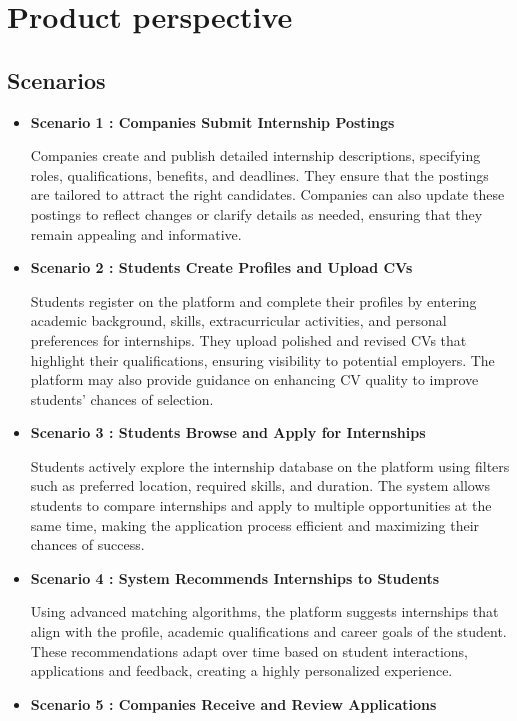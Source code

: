 \section{Product perspective}
\label{sec:product_perspective}%



\subsection{Scenarios}
\label{subsec:scenarios}%
\begin{itemize}
    \item \textbf{Scenario 1 : Companies Submit Internship Postings}

Companies create and publish detailed internship descriptions, specifying roles, qualifications, benefits, and deadlines. They ensure that the postings are tailored to attract the right candidates. Companies can also update these postings to reflect changes or clarify details as needed, ensuring that they remain appealing and informative.
    \item \textbf{Scenario 2 : Students Create Profiles and Upload CVs}

Students register on the platform and complete their profiles by entering academic background, skills, extracurricular activities, and personal preferences for internships. They upload polished and revised CVs that highlight their qualifications, ensuring visibility to potential employers. The platform may also provide guidance on enhancing CV quality to improve students' chances of selection. 
    \item \textbf{Scenario 3 : Students Browse and Apply for Internships} 

Students actively explore the internship database on the platform using filters such as preferred location, required skills, and duration. The system allows students to compare internships and apply to multiple opportunities at the same time, making the application process efficient and maximizing their chances of success.
    \item \textbf{Scenario 4 : \textbf{System Recommends Internships to Students} }

Using advanced matching algorithms, the platform suggests internships that align with the profile, academic qualifications and career goals of the student. These recommendations adapt over time based on student interactions, applications and feedback, creating a highly personalized experience.
\item \textbf{Scenario 5 : \textbf{Companies Receive and Review Applications} }


\end{itemize}
